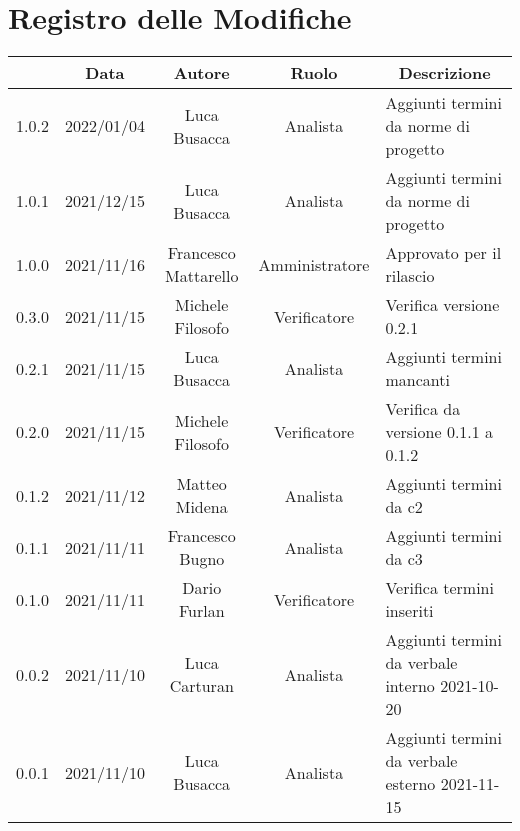 \thispagestyle{empty}
\section*{Registro delle Modifiche}

\begin{center}
	\renewcommand{\arraystretch}{1.8}
	\begin{longtable}[c]{c | c | c | c | p{5cm}}
		\rowcolor[HTML]{125E28}
		\multicolumn{1}{c}{\color[HTML]{FFFFFF} \textbf{Versione}} & 
		\multicolumn{1}{c}{\color[HTML]{FFFFFF} \textbf{Data}} & 
		\multicolumn{1}{c}{\color[HTML]{FFFFFF} \textbf{Autore}} & 
		\multicolumn{1}{c}{\color[HTML]{FFFFFF} \textbf{Ruolo}} & 
		\multicolumn{1}{c}{\color[HTML]{FFFFFF} \textbf{Descrizione}} \\
		\endhead
		1.0.2 & 2022/01/04 &  Luca Busacca & Analista & Aggiunti termini da norme di progetto\\
		1.0.1 & 2021/12/15 & Luca Busacca & Analista & Aggiunti termini da norme di progetto\\
		1.0.0 & 2021/11/16 & Francesco Mattarello & Amministratore & Approvato per il rilascio\\
		0.3.0 & 2021/11/15 & Michele Filosofo & Verificatore & Verifica versione 0.2.1\\
		0.2.1 & 2021/11/15 & Luca Busacca & Analista & Aggiunti termini mancanti\\
		0.2.0 & 2021/11/15 & Michele Filosofo & Verificatore & Verifica da versione 0.1.1 a 0.1.2\\
		0.1.2 & 2021/11/12 & Matteo Midena & Analista & Aggiunti termini da c2\\
		0.1.1 & 2021/11/11 & Francesco Bugno & Analista & Aggiunti termini da c3\\
		0.1.0 & 2021/11/11 & Dario Furlan & Verificatore & Verifica termini inseriti\\
		0.0.2 & 2021/11/10 & Luca Carturan & Analista & Aggiunti termini da verbale interno 2021-10-20\\
		0.0.1 & 2021/11/10 & Luca Busacca & Analista & Aggiunti termini da verbale esterno 2021-11-15\\

	\end{longtable}
\end{center}